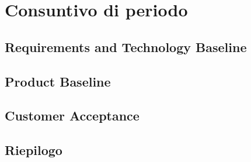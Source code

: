\section{Consuntivo di periodo} \label{section:consuntivo}

\subsection{Requirements and Technology Baseline} \label{subsection:consuntivo_rtb}


\subsection{Product Baseline} \label{subsection:consuntivo_pb}


\subsection{Customer Acceptance} \label{subsection:consuntivo_ca}


\subsection{Riepilogo}